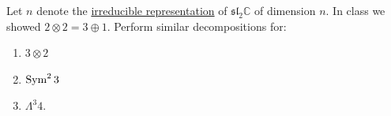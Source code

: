   \begin{exercise} 
    Let $n$ denote the \hyperref[rep-def:irreducible-representation]{irreducible representation} of $\mathfrak{sl}_2\mathbb{C}$ of dimension $n$. In class we showed $2 \otimes 2 = 3 \oplus 1$. Perform similar decompositions for:
    \begin{enumerate}
      \item $3 \otimes 2$ 
      \item $\operatorname{Sym}^2 3$ 
      \item $\Lambda^3 4$. 
    \end{enumerate}
  \end{exercise}

